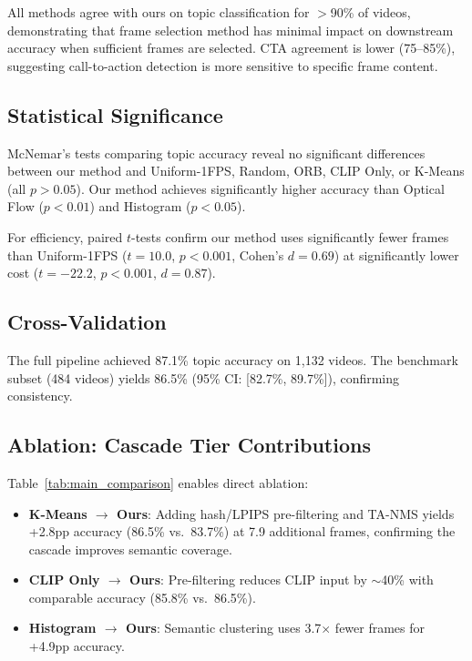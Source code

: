 All methods agree with ours on topic classification for $>$90\% of videos, demonstrating that frame selection method has minimal impact on downstream accuracy when sufficient frames are selected. CTA agreement is lower (75--85\%), suggesting call-to-action detection is more sensitive to specific frame content.

\subsection{Statistical Significance}

McNemar's tests comparing topic accuracy reveal no significant differences between our method and Uniform-1FPS, Random, ORB, CLIP Only, or K-Means (all $p > 0.05$). Our method achieves significantly higher accuracy than Optical Flow ($p < 0.01$) and Histogram ($p < 0.05$).

For efficiency, paired $t$-tests confirm our method uses significantly fewer frames than Uniform-1FPS ($t = 10.0$, $p < 0.001$, Cohen's $d = 0.69$) at significantly lower cost ($t = -22.2$, $p < 0.001$, $d = 0.87$).

\subsection{Cross-Validation}
\label{sec:full_pipeline}

The full pipeline achieved 87.1\% topic accuracy on 1,132 videos. The benchmark subset (484 videos) yields 86.5\% (95\% CI: [82.7\%, 89.7\%]), confirming consistency.

\subsection{Ablation: Cascade Tier Contributions}

Table~\ref{tab:main_comparison} enables direct ablation:
\begin{itemize}
    \item \textbf{K-Means $\rightarrow$ Ours}: Adding hash/LPIPS pre-filtering and TA-NMS yields +2.8pp accuracy (86.5\% vs.\ 83.7\%) at 7.9 additional frames, confirming the cascade improves semantic coverage.
    \item \textbf{CLIP Only $\rightarrow$ Ours}: Pre-filtering reduces CLIP input by $\sim$40\% with comparable accuracy (85.8\% vs.\ 86.5\%).
    \item \textbf{Histogram $\rightarrow$ Ours}: Semantic clustering uses 3.7$\times$ fewer frames for +4.9pp accuracy.
\end{itemize}

